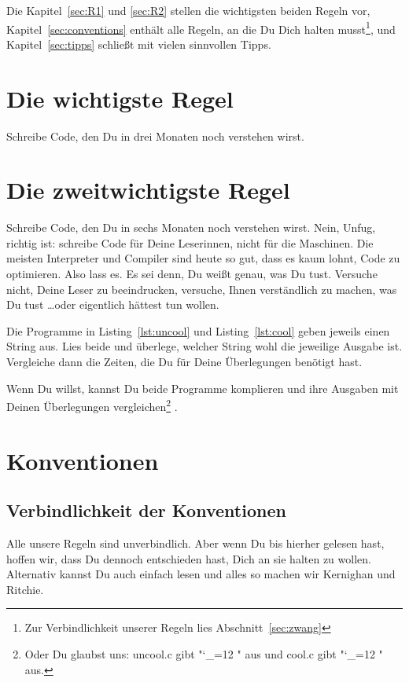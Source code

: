 \documentclass[twoside]{scrartcl}
\begin{document}
Die Kapitel~\ref{sec:R1} und \ref{sec:R2} stellen die wichtigsten beiden Regeln
vor, Kapitel~\ref{sec:conventions} enth\"a{}lt alle Regeln, an die Du Dich
halten musst\footnote{
  Zur Verbindlichkeit unserer Regeln lies Abschnitt~\ref{sec:zwang}
}, und Kapitel~\ref{sec:tipps} schlie\ss{}t mit vielen sinnvollen Tipps.

\section{Die wichtigste Regel\label{sec:R1}}
Schreibe Code, den Du in drei Monaten noch verstehen wirst.

\section{Die zweitwichtigste Regel\label{sec:R2}}
Schreibe Code, den Du in sechs Monaten noch verstehen wirst. Nein, Unfug,
richtig ist: schreibe Code f\"u{}r Deine Leserinnen, nicht f\"u{}r die
Maschinen. Die meisten Interpreter und Compiler sind heute so gut, dass es
kaum lohnt, Code zu optimieren. Also lass es. Es sei denn, Du wei\ss{}t
genau, was Du tust. Versuche nicht, Deine Leser zu beeindrucken, versuche, Ihnen
verst\"a{}ndlich zu machen, was Du tust \ldots oder eigentlich h\"a{}ttest tun
wollen.

Die Programme in  Listing~\ref{lst:uncool} und Listing~\ref{lst:cool} geben
jeweils einen String aus. Lies beide und
\"u{}berlege, welcher String wohl die jeweilige Ausgabe ist. Vergleiche dann die
Zeiten, die Du f\"u{}r Deine \"U{}berlegungen ben\"o{}tigt 
hast. 





Wenn Du willst, kannst Du  beide Programme komplieren und ihre Ausgaben mit
Deinen \"U{}berlegungen vergleichen\footnote{%
%
Oder Du glaubst uns: uncool.c gibt 
"\catcode`_=12 \ttfamily "
aus und cool.c gibt  
"\catcode`_=12 \ttfamily "
aus.
}%
. 

\section{Konventionen\label{sec:conventions}}
\subsection{Verbindlichkeit der Konventionen\label{sec:zwang}}
Alle unsere Regeln sind unverbindlich. Aber wenn Du bis hierher gelesen hast,
hoffen wir, dass Du dennoch entschieden hast, Dich an sie halten zu wollen.
Alternativ kannst Du auch einfach \cite{KR} lesen und alles so machen wir 
Kernighan und Ritchie.
\end{document}
